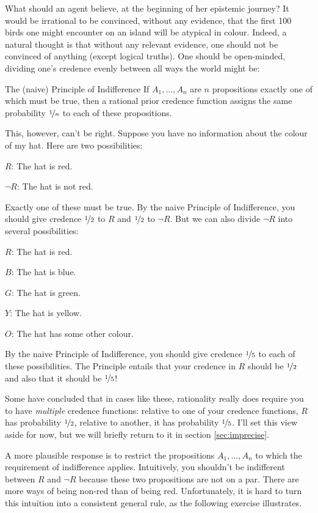 What should an agent believe, at the beginning of her epistemic journey? It
would be irrational to be convinced, without any evidence, that the first 100
birds one might encounter on an island will be atypical in colour. Indeed, a natural
thought is that without any relevant evidence, one should not be convinced of
anything (except logical truths). One should be open-minded,
dividing one's credence evenly between all ways the world might be:
%
\begin{genericthm}{The (naive) Principle of Indifference}
  If $A_1,\ldots,A_n$ are $n$ propositions exactly one of which must be true,
  then a rational prior credence function assigns the same probability
  $\nicefrac{1}{n}$ to each of these propositions.
\end{genericthm}
%
This, however, can't be right. Suppose you have no information about the colour
of my hat. Here are two possibilities:
\begin{enumerate*}
\item[$R$:] The hat is red.
\item[$\neg R$:] The hat is not red.
\end{enumerate*}
Exactly one of these must be true. By the naive Principle of Indifference, you
should give credence $\nicefrac{1}{2}$ to $R$ and $\nicefrac{1}{2}$ to $\neg R$.
But we can also divide $\neg R$ into several possibilities:
\begin{enumerate*}
\item[$R$:] The hat is red.
\item[$B$:] The hat is blue.
\item[$G$:] The hat is green.
\item[$Y$:] The hat is yellow.
\item[$O$:] The hat has some other colour.
\end{enumerate*}
By the naive Principle of Indifference, you should give credence
$\nicefrac{1}{5}$ to each of these possibilities. The Principle entails that
your credence in $R$ should be $\nicefrac{1}{2}$ and also that it should be
$\nicefrac{1}{5}$!

Some have concluded that in cases like these, rationality really does require
you to have \emph{multiple} credence functions: relative to one of your credence
functions, $R$ has probability $\nicefrac{1}{2}$, relative to another, it has
probability $\nicefrac{1}{5}$. I'll set this view aside for now, but we will
briefly return to it in section \ref{sec:imprecise}.

A more plausible response is to restrict the propositions $A_1,\ldots,A_n$ to
which the requirement of indifference applies. Intuitively, you shouldn't be
indifferent between $R$ and $\neg R$ because these two propositions are not on a
par. There are more ways of being non-red than of being red. Unfortunately, it
is hard to turn this intuition into a consistent general rule, as the following
exercise illustrates.

